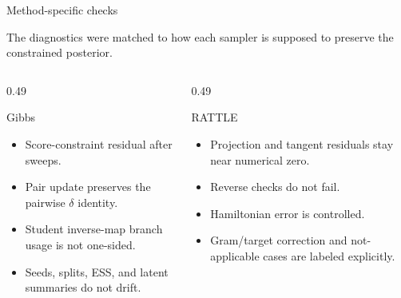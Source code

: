 \documentclass[11pt,aspectratio=169]{beamer}
\newcommand{\claim}[1]{\begin{block}{}\large #1\end{block}}
\begin{document}
\begin{frame}{Method-specific checks}
  \claim{The diagnostics were matched to how each sampler is supposed to preserve the constrained posterior.}
  \begin{columns}[T,onlytextwidth]
    \begin{column}{0.49\textwidth}
      \begin{block}{Gibbs}
        \begin{itemize}
          \item Score-constraint residual after sweeps.
          \item Pair update preserves the pairwise $\delta$ identity.
          \item Student inverse-map branch usage is not one-sided.
          \item Seeds, splits, ESS, and latent summaries do not drift.
        \end{itemize}
      \end{block}
    \end{column}
    \begin{column}{0.49\textwidth}
      \begin{block}{RATTLE}
        \begin{itemize}
          \item Projection and tangent residuals stay near numerical zero.
          \item Reverse checks do not fail.
          \item Hamiltonian error is controlled.
          \item Gram/target correction and not-applicable cases are labeled explicitly.
        \end{itemize}
      \end{block}
    \end{column}
  \end{columns}
\end{frame}
\end{document}
